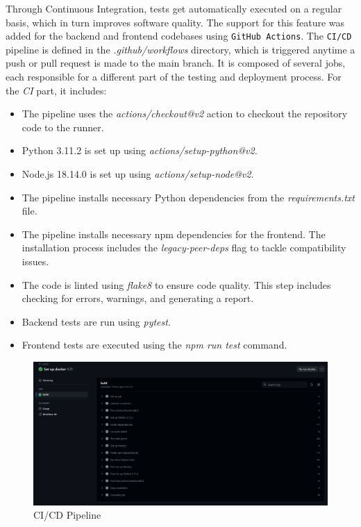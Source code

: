 Through Continuous Integration, tests get automatically executed on a regular basis, which in turn improves software quality. The support for this feature was added for the backend and frontend codebases using \texttt{GitHub Actions}. The \texttt{CI/CD} pipeline is defined in the \textit{.github/workflows} directory, which is triggered anytime a push or pull request is made to the main branch. It is composed of several jobs, each responsible for a different part of the testing and deployment process. For the \textit{CI} part, it includes:

\begin{itemize}
    \item The pipeline uses the \textit{actions/checkout@v2} action to checkout the repository code to the runner.
    \item Python 3.11.2 is set up using \textit{actions/setup-python@v2}.
    \item Node.js 18.14.0 is set up using \textit{actions/setup-node@v2}.
    \item The pipeline installs necessary Python dependencies from the \textit{requirements.txt} file.
    \item The pipeline installs necessary npm dependencies for the frontend. The installation process includes the \textit{legacy-peer-deps} flag to tackle compatibility issues.
    \item The code is linted using \textit{flake8} to ensure code quality. This step includes checking for errors, warnings, and generating a report.
    \item Backend tests are run using \textit{pytest}.
    \item Frontend tests are executed using the \textit{npm run test} command.
\end{itemize}

\begin{figure}[!ht]
    \centering
    \includegraphics[width=1\linewidth]{LATEX/Appendices/Images/Pipeline_CI_CD/github_actions_CI_CD_pipeline.png}
    \caption{CI/CD Pipeline}
    \label{fig:CI/CD-Pipeline}
\end{figure}

